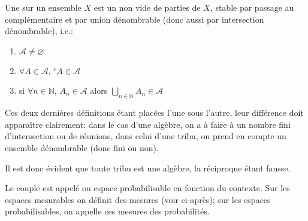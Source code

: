 \medskip
\begin{definition}[Tribu]
Une  sur un ensemble $X$ est un 
non vide de parties de $X$,  stable par passage au complémentaire et par union dénombrable
(donc aussi par intersection  dénombrable), i.e.:
\begin{enumerate}
 \item $\mathcal{A} \not=\varnothing$
 \item $\forall A \in \mathcal{A}$, ${}^c A \in\mathcal{A}$%
\item si $\forall n \in \mathbb{N}$, $A_n \in\mathcal{A}$ alors $\bigcup_{n\in\mathbb{N} } A_n \in\mathcal{A}$
\end{enumerate}
\end{definition}

Ces deux dernières définitions étant placées l'une sous l'autre, leur différence doit apparaître clairement:
dans le cas d'une algèbre, on a à faire à un nombre fini d'intersection ou de réunions, dans celui
d'une tribu, on prend en compte un ensemble dénombrable (donc fini ou non).

\medskip
Il est donc évident que toute tribu est une algèbre, la réciproque étant fausse.

\begin{definition}
Le couple  est appelé  ou espace probabilisable en fonction du contexte.
Sur les espaces mesurables on définit des mesures (voir ci-après); sur les espaces probabilisables, on
appelle ces mesures des probabilités.
\end{definition}

